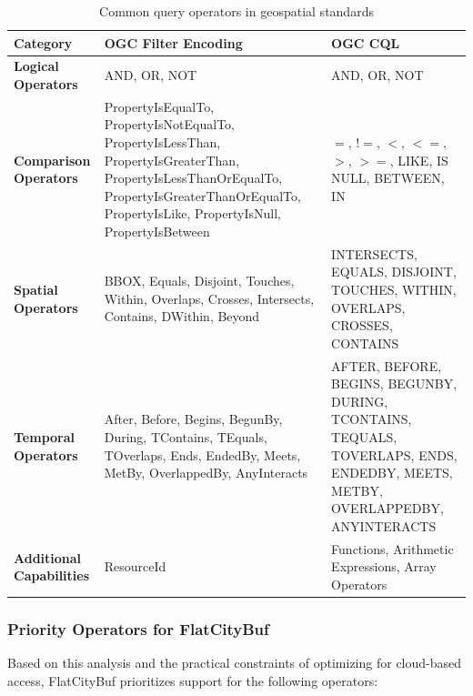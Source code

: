 \begin{table}[ht]
  \centering
  \caption{Common query operators in geospatial standards}
  \label{tab:query_operators}
  \begin{tabular}{p{3cm}p{5cm}p{5cm}}
    \hline
    \textbf{Category} & \textbf{OGC Filter Encoding} & \textbf{OGC CQL} \\
    \hline
    \textbf{Logical Operators} &
    AND, OR, NOT &
    AND, OR, NOT \\
    \hline
    \textbf{Comparison Operators} &
    PropertyIsEqualTo, PropertyIsNotEqualTo, PropertyIsLessThan, PropertyIsGreaterThan, PropertyIsLessThanOrEqualTo, PropertyIsGreaterThanOrEqualTo, PropertyIsLike, PropertyIsNull, PropertyIsBetween &
    $=$, $!=$, $<$, $<=$, $>$, $>=$, LIKE, IS NULL, BETWEEN, IN \\
    \hline
    \textbf{Spatial Operators} &
    BBOX, Equals, Disjoint, Touches, Within, Overlaps, Crosses, Intersects, Contains, DWithin, Beyond &
    INTERSECTS, EQUALS, DISJOINT, TOUCHES, WITHIN, OVERLAPS, CROSSES, CONTAINS \\
    \hline
    \textbf{Temporal Operators} &
    After, Before, Begins, BegunBy, During, TContains, TEquals, TOverlaps, Ends, EndedBy, Meets, MetBy, OverlappedBy, AnyInteracts &
    AFTER, BEFORE, BEGINS, BEGUNBY, DURING, TCONTAINS, TEQUALS, TOVERLAPS, ENDS, ENDEDBY, MEETS, METBY, OVERLAPPEDBY, ANYINTERACTS \\
    \hline
    \textbf{Additional Capabilities} &
    ResourceId &
    Functions, Arithmetic Expressions, Array Operators \\
    \hline
  \end{tabular}
\end{table}

\subsubsection{Priority Operators for FlatCityBuf}
\label{methodology:attribute_index:query_requirements:priorities}

Based on this analysis and the practical constraints of optimizing for cloud-based access, FlatCityBuf prioritizes support for the following operators:

